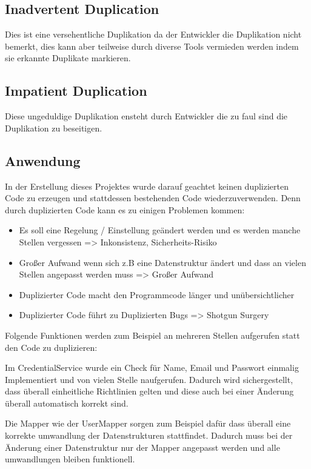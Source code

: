 \subsection{Inadvertent Duplication}
Dies ist eine versehentliche Duplikation da der Entwickler die Duplikation nicht bemerkt,
dies kann aber teilweise durch diverse Tools vermieden werden indem sie erkannte Duplikate markieren.
\subsection{Impatient Duplication}
Diese ungeduldige Duplikation ensteht durch Entwickler die zu faul sind die Duplikation zu beseitigen.

\subsection{Anwendung}

In der Erstellung dieses Projektes wurde darauf geachtet keinen duplizierten Code zu erzeugen und stattdessen bestehenden Code wiederzuverwenden.
Denn durch duplizierten Code kann es zu einigen Problemen kommen:
\begin{itemize}
    \item Es soll eine Regelung / Einstellung geändert werden und es werden manche Stellen vergessen => Inkonsistenz, Sicherheits-Risiko
    \item Großer Aufwand wenn sich z.B eine Datenstruktur ändert und dass an vielen Stellen angepasst werden muss => Großer Aufwand
    \item Duplizierter Code macht den Programmcode länger und unübersichtlicher
    \item Duplizierter Code führt zu Duplizierten Bugs => Shotgun Surgery
\end{itemize}
Folgende Funktionen werden zum Beispiel an mehreren Stellen aufgerufen statt den Code zu duplizieren:

Im CredentialService wurde ein Check für Name, Email und Passwort einmalig Implementiert und von vielen Stelle naufgerufen.
Dadurch wird sichergestellt, dass überall einheitliche Richtlinien gelten und diese auch bei einer Änderung überall automatisch korrekt sind.

Die Mapper wie der UserMapper sorgen zum Beispiel dafür dass überall eine korrekte umwandlung der Datenstrukturen stattfindet.
Dadurch muss bei der Änderung einer Datenstruktur nur der Mapper angepasst werden und alle umwandlungen bleiben funktionell.
